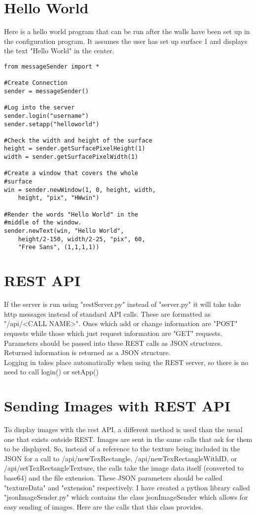 \documentclass{acm_proc_article-sp}
\begin{document}
\section{Hello World}
Here is a hello world program that can be run after the walls have been set up in the configuration program. It assumes the user has set up surface 1 and displays the text "Hello World" in the center.
\lstset{language=Python}
\begin{lstlisting}[frame=single]
from messageSender import *

#Create Connection
sender = messageSender()

#Log into the server
sender.login("username")
sender.setapp("helloworld")

#Check the width and height of the surface
height = sender.getSurfacePixelHeight(1)
width = sender.getSurfacePixelWidth(1)

#Create a window that covers the whole 
#surface
win = sender.newWindow(1, 0, height, width, 
	height, "pix", "HWwin")
	
#Render the words "Hello World" in the 
#middle of the window.
sender.newText(win, "Hello World", 
	height/2-150, width/2-25, "pix", 60, 
	"Free Sans", (1,1,1,1))
\end{lstlisting}
\section{REST API}
If the server is run using "restServer.py" instead of "server.py" it will take take http messages instead of standard API calls. These are formatted as "/api/<CALL NAME>". Ones which add or change information are "POST" requests while those which just request information are "GET" requests. Parameters should be passed into these REST calls as JSON structures. Returned information is returned as a JSON structure.\\
Logging in takes place automatically when using the REST server, so there is no need to call login() or setApp()
\section{Sending Images with REST API}
To display images with the rest API, a different method is used than the usual one that exists outside REST. Images are sent in the same calls that ask for them to be displayed. So, instead of a reference to the texture being included in the JSON for a call to /api/newTexRectangle, /api/newTexRectangleWithID, or /api/setTexRectangleTexture, the calls take the image data itself (converted to base64) and the file extension. These JSON parameters should be called "textureData" and "extension" respectively. I have created a python library called "jsonImageSender.py" which contains the class jsonImageSender which allows for easy sending of images. Here are the calls that this class provides.\\\\
\end{document}
